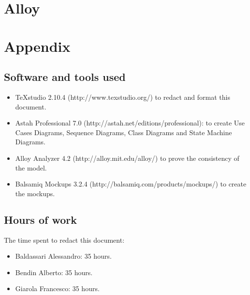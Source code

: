 \documentclass[a4paper,11pt]{report} %
\begin{document}
	\pagebreak

	\section{Alloy}
	
	
	\pagebreak
	
		\noindent%
		\begin{minipage}{\linewidth}
		\vspace*{-0.7cm}
		\end{minipage}	
		
	\pagebreak	
	
	\section{Appendix}
	
	\subsection{Software and tools used}
	\begin{itemize}
		\item TeXstudio 2.10.4 (http://www.texstudio.org/) to redact and format this document.
		\item Astah Professional 7.0 (http://astah.net/editions/professional): to create Use
		Cases Diagrams, Sequence Diagrams, Class Diagrams and State Machine	Diagrams.
		\item Alloy Analyzer 4.2 (http://alloy.mit.edu/alloy/) to prove the consistency of
		the model.
		\item Balsamiq Mockups 3.2.4 (http://balsamiq.com/products/mockups/) to create the mockups.
	\end{itemize}
	
	\subsection{Hours of work} The time spent to redact this document:
	\begin{itemize}
		\item Baldassari Alessandro: 35 hours.
		\item Bendin Alberto: 35 hours.
		\item Giarola Francesco: 35 hours.
	\end{itemize}
	
	
\end{document}
